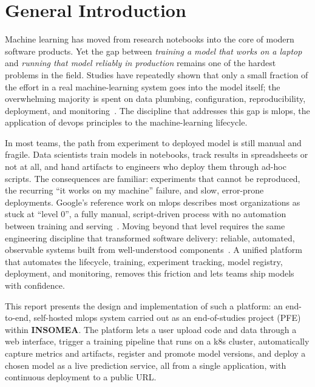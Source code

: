 \chapter*{General Introduction}

Machine learning has moved from research notebooks into the core of modern
software products. Yet the gap between \emph{training a model that works on a
laptop} and \emph{running that model reliably in production} remains one of the
hardest problems in the field. Studies have repeatedly shown that only a small
fraction of the effort in a real machine-learning system goes into the model
itself; the overwhelming majority is spent on data plumbing, configuration,
reproducibility, deployment, and monitoring~\cite{sculley2015hidden}. The
discipline that addresses this gap is \gls{mlops}, the application of
\gls{devops} principles to the machine-learning lifecycle.

In most teams, the path from experiment to deployed model is still manual and
fragile. Data scientists train models in notebooks, track results in
spreadsheets or not at all, and hand artifacts to engineers who deploy them
through ad-hoc scripts. The consequences are familiar: experiments that cannot
be reproduced, the recurring ``it works on my machine'' failure, and slow,
error-prone deployments. Google's reference work on \gls{mlops} describes most
organizations as stuck at ``level 0'', a fully manual, script-driven process
with no automation between training and serving~\cite{google_mlops}. Moving
beyond that level requires the same engineering discipline that transformed
software delivery: reliable, automated, observable systems built from
well-understood components~\cite{kleppmann2017designing}. A unified platform
that automates the lifecycle, training, experiment tracking, model registry,
deployment, and monitoring, removes this friction and lets teams ship models
with confidence.

This report presents the design and implementation of such a platform: an
end-to-end, self-hosted \gls{mlops} system carried out as an end-of-studies
project (PFE) within \textbf{INSOMEA}. The platform lets a user upload code and
data through a web interface, trigger a training pipeline that runs on a
\gls{k8s} cluster, automatically capture metrics and artifacts, register and
promote model versions, and deploy a chosen model as a live prediction service,
all from a single application, with continuous deployment to a public URL.


